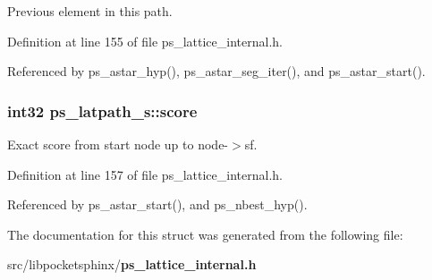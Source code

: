 Previous element in this path. 



Definition at line 155 of file ps\-\_\-lattice\-\_\-internal.\-h.



Referenced by ps\-\_\-astar\-\_\-hyp(), ps\-\_\-astar\-\_\-seg\-\_\-iter(), and ps\-\_\-astar\-\_\-start().

\subsubsection[{score}]{\setlength{\rightskip}{0pt plus 5cm}int32 ps\-\_\-latpath\-\_\-s\-::score}\label{structps__latpath__s_a9249fb528f754db992df1d494a69b580}


Exact score from start node up to node-\/$>$sf. 



Definition at line 157 of file ps\-\_\-lattice\-\_\-internal.\-h.



Referenced by ps\-\_\-astar\-\_\-start(), and ps\-\_\-nbest\-\_\-hyp().



The documentation for this struct was generated from the following file\-:\begin{DoxyCompactItemize}
\item 
src/libpocketsphinx/{\bf ps\-\_\-lattice\-\_\-internal.\-h}\end{DoxyCompactItemize}
